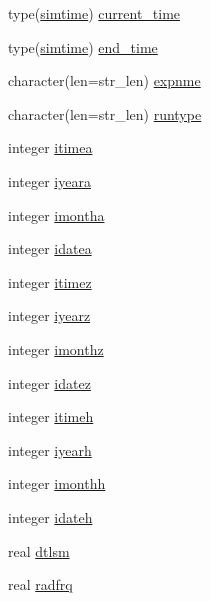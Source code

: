 \begin{DoxyCompactItemize}
\item 
type(\hyperlink{structed__misc__coms_1_1simtime}{simtime}) \hyperlink{namespaceed__misc__coms_a74892b22b952f148c3ba1bfb0f150692}{current\+\_\+time}
\item 
type(\hyperlink{structed__misc__coms_1_1simtime}{simtime}) \hyperlink{namespaceed__misc__coms_a6b19c4e99a003ac8f1dbda410dd35599}{end\+\_\+time}
\item 
character(len=str\+\_\+len) \hyperlink{namespaceed__misc__coms_a0ce8ecbb164c2b948efa6fca900dd9d0}{expnme}
\item 
character(len=str\+\_\+len) \hyperlink{namespaceed__misc__coms_ac6069e59fcce057c13f934284b112682}{runtype}
\item 
integer \hyperlink{namespaceed__misc__coms_a7861e694d07384bd17925c3f4607b525}{itimea}
\item 
integer \hyperlink{namespaceed__misc__coms_acd0b7adb20595807c690a5e091d4adab}{iyeara}
\item 
integer \hyperlink{namespaceed__misc__coms_a77a981fafd63a7d95ae3c331a43383dd}{imontha}
\item 
integer \hyperlink{namespaceed__misc__coms_a5f114c94d8dae7a612c2a74dd15cf9e8}{idatea}
\item 
integer \hyperlink{namespaceed__misc__coms_a52d1c4a5cf64ff5aeded21a7cf0583b3}{itimez}
\item 
integer \hyperlink{namespaceed__misc__coms_ad090bb31c332e954cdd55abd938fed1d}{iyearz}
\item 
integer \hyperlink{namespaceed__misc__coms_a21c190fb313ac537f9025274d8e8075e}{imonthz}
\item 
integer \hyperlink{namespaceed__misc__coms_a05d9796c9d0896819a7a79828f8272ab}{idatez}
\item 
integer \hyperlink{namespaceed__misc__coms_a8a7adcff3ecba9c5b71afd58481a9b7b}{itimeh}
\item 
integer \hyperlink{namespaceed__misc__coms_a837450f62eb3c1e01ddace809d123883}{iyearh}
\item 
integer \hyperlink{namespaceed__misc__coms_acd8c94d7731ef2f85c4c39dea743ba84}{imonthh}
\item 
integer \hyperlink{namespaceed__misc__coms_a7f0ac337a2c6f52fc1e034d5e0bfeb6b}{idateh}
\item 
real \hyperlink{namespaceed__misc__coms_ae6a9bf60ef97f576201d615634834480}{dtlsm}
\item 
real \hyperlink{namespaceed__misc__coms_aa6d6705e0925a134d7918ff8ac88f6f4}{radfrq}

\end{DoxyCompactItemize}
